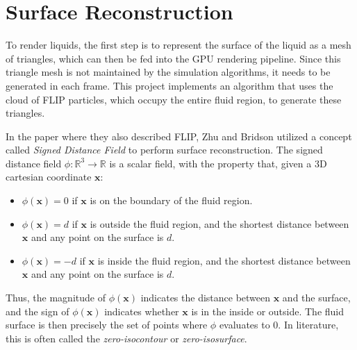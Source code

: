 \section{Surface Reconstruction}
\label{section surface reconstruction}
To render liquids, the first step is to represent the surface of the liquid as a mesh of triangles, which can then be fed into the GPU rendering pipeline. Since this triangle mesh is not maintained by the simulation algorithms, it needs to be generated in each frame. This project implements an algorithm that uses the cloud of FLIP particles, which occupy the entire fluid region, to generate these triangles.

In the paper where they also described FLIP\cite{zhu2005animating}, Zhu and Bridson utilized a concept called \textit{Signed Distance Field} to perform surface reconstruction. The signed distance field $\phi : \mathbb{R} ^3 \rightarrow \mathbb{R}$  is a scalar field, with the property that, given a 3D cartesian coordinate $\textbf{x}$:
\begin{itemize}
    \item $\phi(\textbf{x}) = 0$ if $\textbf{x}$ is on the boundary of the fluid region.
    
    \item $\phi(\textbf{x}) = d$ if $\textbf{x}$ is outside the fluid region, and the shortest distance between $\textbf{x}$ and any point on the surface is $d$.
    
    \item $\phi(\textbf{x}) = -d$ if $\textbf{x}$ is inside the fluid region, and the shortest distance between $\textbf{x}$ and any point on the surface is $d$.
\end{itemize}
Thus, the magnitude of $\phi(\textbf{x})$ indicates the distance between $\textbf{x}$ and the surface, and the sign of $\phi(\textbf{x})$ indicates whether $\textbf{x}$ is in the inside or outside. The fluid surface is then precisely the set of points where $\phi$ evaluates to 0. In literature, this is often called the \textit{zero-isocontour} or \textit{zero-isosurface}.

